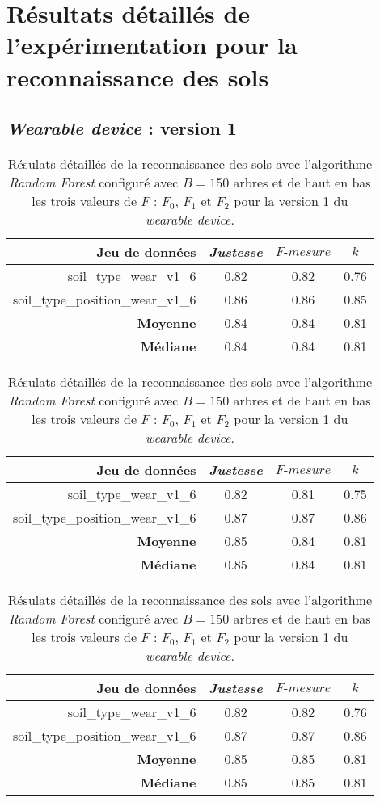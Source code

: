 \chapter{Résultats détaillés de l'expérimentation pour la reconnaissance des sols}
\label{anx:a}

\section{\textit{Wearable device} : version 1}
\label{anx:a1}

\begin{table}[H]\renewcommand{\arraystretch}{0.5}
	\centering
	\caption{Résulats détaillés de la reconnaissance des sols avec l'algorithme \textit{Random Forest} configuré avec $B=150$ arbres et de haut en bas les trois valeurs de $F$ : $F_0$, $F_1$ et $F_2$ pour la version 1 du \textit{wearable device}.}
	\label{tab:rf-150-wear-v1}
	\begin{tabular}{@{}rccc@{}}
		\toprule
			\textbf{Jeu de données} & \textit{Justesse} & $F\mbox{-} mesure$ & \textbf{$k$} \\
		\midrule
			soil\_type\_wear\_v1\_6 & 0.82 & 0.82 & 0.76 \\
			soil\_type\_position\_wear\_v1\_6 & 0.86 & 0.86 & 0.85 \\
			\textbf{Moyenne} & 0.84 & 0.84 & 0.81 \\
			\textbf{Médiane} & 0.84 & 0.84 & 0.81 \\
	\end{tabular}
	\begin{tabular}{@{}rccc@{}}
		\toprule
			\textbf{Jeu de données} & \textit{Justesse} & $F\mbox{-} mesure$ & \textbf{$k$} \\
		\midrule
			soil\_type\_wear\_v1\_6 & 0.82 & 0.81 & 0.75 \\
			soil\_type\_position\_wear\_v1\_6 & 0.87 & 0.87 & 0.86 \\
			\textbf{Moyenne} & 0.85 & 0.84 & 0.81 \\
			\textbf{Médiane} & 0.85 & 0.84 & 0.81 \\
	\end{tabular}
	\begin{tabular}{@{}rccc@{}}
		\toprule
			\textbf{Jeu de données} & \textit{Justesse} & $F\mbox{-} mesure$ & \textbf{$k$} \\
		\midrule
			soil\_type\_wear\_v1\_6 & 0.82 & 0.82 & 0.76 \\
			soil\_type\_position\_wear\_v1\_6 & 0.87 & 0.87 & 0.86 \\
			\textbf{Moyenne} & 0.85 & 0.85 & 0.81 \\
			\textbf{Médiane} & 0.85 & 0.85 & 0.81 \\
		\bottomrule
	\end{tabular}
\end{table}

